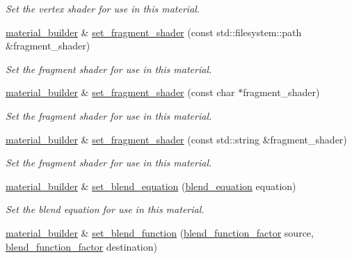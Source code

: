 \begin{DoxyCompactItemize}
\begin{DoxyCompactList}\small\item\em Set the vertex shader for use in this material. \end{DoxyCompactList}\item 
\mbox{\hyperlink{classmoka_1_1material__builder}{material\+\_\+builder}} \& \mbox{\hyperlink{classmoka_1_1material__builder_a116f4590c6b6a0eda08be0b8a7223532}{set\+\_\+fragment\+\_\+shader}} (const std\+::filesystem\+::path \&fragment\+\_\+shader)
\begin{DoxyCompactList}\small\item\em Set the fragment shader for use in this material. \end{DoxyCompactList}\item 
\mbox{\hyperlink{classmoka_1_1material__builder}{material\+\_\+builder}} \& \mbox{\hyperlink{classmoka_1_1material__builder_ad6470a4af986c3c6bc83226cbaa73be3}{set\+\_\+fragment\+\_\+shader}} (const char $\ast$fragment\+\_\+shader)
\begin{DoxyCompactList}\small\item\em Set the fragment shader for use in this material. \end{DoxyCompactList}\item 
\mbox{\hyperlink{classmoka_1_1material__builder}{material\+\_\+builder}} \& \mbox{\hyperlink{classmoka_1_1material__builder_a241303620910f8f1cd2b9e7cd9028676}{set\+\_\+fragment\+\_\+shader}} (const std\+::string \&fragment\+\_\+shader)
\begin{DoxyCompactList}\small\item\em Set the fragment shader for use in this material. \end{DoxyCompactList}\item 
\mbox{\hyperlink{classmoka_1_1material__builder}{material\+\_\+builder}} \& \mbox{\hyperlink{classmoka_1_1material__builder_a3e5ed182781eace67b436c3f1b6c068d}{set\+\_\+blend\+\_\+equation}} (\mbox{\hyperlink{namespacemoka_acf03408f89c521244763fb5f8746ce16}{blend\+\_\+equation}} equation)
\begin{DoxyCompactList}\small\item\em Set the blend equation for use in this material. \end{DoxyCompactList}\item 
\mbox{\hyperlink{classmoka_1_1material__builder}{material\+\_\+builder}} \& \mbox{\hyperlink{classmoka_1_1material__builder_aa7a7856e574c217b4f602358ac70813b}{set\+\_\+blend\+\_\+function}} (\mbox{\hyperlink{namespacemoka_a631c77633ed9ed0c34a6632a8211a19d}{blend\+\_\+function\+\_\+factor}} source, \mbox{\hyperlink{namespacemoka_a631c77633ed9ed0c34a6632a8211a19d}{blend\+\_\+function\+\_\+factor}} destination)

\end{DoxyCompactItemize}

